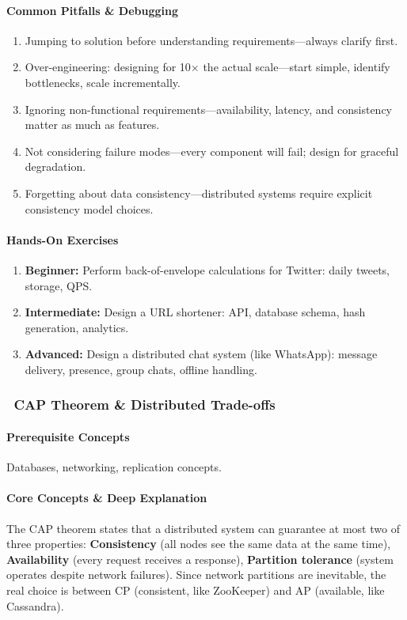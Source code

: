 \documentclass[11pt, a4paper, oneside]{report}
\newcommand{\mustmaster}[1]{\subsubsection{\texorpdfstring{\fcolorbox{blue!40!black}{blue!8}{\footnotesize\bfseries\color{blue!40!black} MUST MASTER}~#1}{#1}}}
\begin{document}
\paragraph{Common Pitfalls \& Debugging}
\begin{enumerate}[leftmargin=*]
\item Jumping to solution before understanding requirements---always clarify first.
\item Over-engineering: designing for 10$\times$ the actual scale---start simple, identify bottlenecks, scale incrementally.
\item Ignoring non-functional requirements---availability, latency, and consistency matter as much as features.
\item Not considering failure modes---every component will fail; design for graceful degradation.
\item Forgetting about data consistency---distributed systems require explicit consistency model choices.
\end{enumerate}

\paragraph{Hands-On Exercises}
\begin{enumerate}[leftmargin=*]
\item \textbf{Beginner:} Perform back-of-envelope calculations for Twitter: daily tweets, storage, QPS.
\item \textbf{Intermediate:} Design a URL shortener: API, database schema, hash generation, analytics.
\item \textbf{Advanced:} Design a distributed chat system (like WhatsApp): message delivery, presence, group chats, offline handling.
\end{enumerate}

\mustmaster{CAP Theorem \& Distributed Trade-offs}

\paragraph{Prerequisite Concepts} Databases, networking, replication concepts.

\paragraph{Core Concepts \& Deep Explanation} The CAP theorem states that a distributed system can guarantee at most two of three properties: \textbf{Consistency} (all nodes see the same data at the same time), \textbf{Availability} (every request receives a response), \textbf{Partition tolerance} (system operates despite network failures). Since network partitions are inevitable, the real choice is between CP (consistent, like ZooKeeper) and AP (available, like Cassandra).
\end{document}
